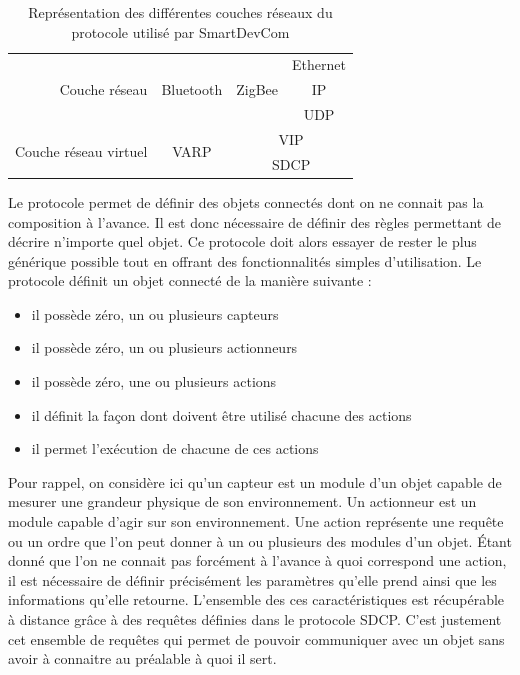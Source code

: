 		\begin{table}[!ht]
			\centering
			\begin{tabular}{r|c|c|c|}
				\cline{2-4}
				& & & Ethernet \\ \cline{4-4}
				Couche réseau & Bluetooth & ZigBee & IP \\ \cline{4-4}
				& & & UDP \\ \cline{2-4}
				\multirow{2}{*}{Couche réseau virtuel} & \multirow{2}{*}{VARP} & 
				\multicolumn{2}{c|}{VIP} \\ \cline{3-4}
				&                      & \multicolumn{2}{c|}{SDCP} \\
				\cline{2-4}
			\end{tabular}
			\caption{Représentation des différentes couches réseaux du protocole utilisé par 
					   SmartDevCom}
			\label{modeleCouche}
		\end{table}
		
		Le protocole permet de définir des objets connectés dont on ne connait pas la composition à 
		l'avance. Il est donc nécessaire de définir des règles permettant de décrire n'importe quel
		objet. Ce protocole doit alors essayer de rester le plus générique possible tout en offrant
		des fonctionnalités simples d'utilisation. Le protocole définit un objet connecté de la 
		manière suivante :
		\begin{itemize}
			\item il possède zéro, un ou plusieurs capteurs
			\item il possède zéro, un ou plusieurs actionneurs
			\item il possède zéro, une ou plusieurs actions
			\item il définit la façon dont doivent être utilisé chacune des actions
			\item il permet l'exécution de chacune de ces actions
		\end{itemize}
		
		Pour rappel, on considère ici qu'un capteur est un module d'un objet capable de mesurer une
		grandeur physique de son environnement. Un actionneur est un module capable d'agir sur son
		environnement. Une action représente une requête ou un ordre que l'on peut donner à un ou
		plusieurs des modules d'un objet. Étant donné que l'on ne connait pas forcément à l'avance
		à quoi correspond une action, il est nécessaire de définir précisément les paramètres qu'elle
		prend ainsi que les informations qu'elle retourne. L'ensemble des ces caractéristiques est
		récupérable à distance grâce à des requêtes définies dans le protocole SDCP. C'est justement
		cet ensemble de requêtes qui permet de pouvoir communiquer avec un objet sans avoir à connaitre au préalable à quoi il sert.
		

